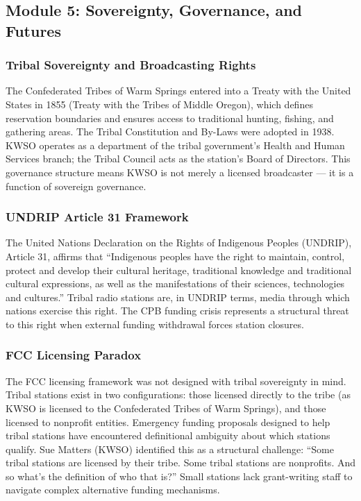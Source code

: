 \documentclass[11pt,letterpaper]{article}
\begin{document}
\subsection{Module 5: Sovereignty, Governance, and Futures}

\subsubsection{Tribal Sovereignty and Broadcasting Rights}

The Confederated Tribes of Warm Springs entered into a Treaty with the United States in 1855 (Treaty with the Tribes of Middle Oregon), which defines reservation boundaries and ensures access to traditional hunting, fishing, and gathering areas. The Tribal Constitution and By-Laws were adopted in 1938. KWSO operates as a department of the tribal government's Health and Human Services branch; the Tribal Council acts as the station's Board of Directors. This governance structure means KWSO is not merely a licensed broadcaster --- it is a function of sovereign governance.

\subsubsection{UNDRIP Article 31 Framework}

The United Nations Declaration on the Rights of Indigenous Peoples (UNDRIP), Article 31, affirms that ``Indigenous peoples have the right to maintain, control, protect and develop their cultural heritage, traditional knowledge and traditional cultural expressions, as well as the manifestations of their sciences, technologies and cultures.'' Tribal radio stations are, in UNDRIP terms, media through which nations exercise this right. The CPB funding crisis represents a structural threat to this right when external funding withdrawal forces station closures.

\subsubsection{FCC Licensing Paradox}

The FCC licensing framework was not designed with tribal sovereignty in mind. Tribal stations exist in two configurations: those licensed directly to the tribe (as KWSO is licensed to the Confederated Tribes of Warm Springs), and those licensed to nonprofit entities. Emergency funding proposals designed to help tribal stations have encountered definitional ambiguity about which stations qualify. Sue Matters (KWSO) identified this as a structural challenge: ``Some tribal stations are licensed by their tribe. Some tribal stations are nonprofits. And so what's the definition of who that is?'' Small stations lack grant-writing staff to navigate complex alternative funding mechanisms.
\end{document}
